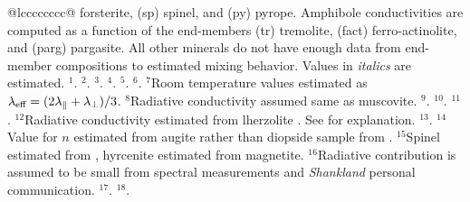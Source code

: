 \begin{table}
\begin{tabular}{@{}lcccccccc@{}}
{        forsterite, (sp) spinel, and (py) pyrope.  Amphibole conductivities
        are computed as a function of the end-members (tr) tremolite,
        (fact) ferro-actinolite, and (parg) pargasite.  All other minerals
        do not have enough data from end-member compositions to estimated
        mixing behavior.  Values in {\it italics} are estimated.
        $^{1}${\citet{Hoefer&Schilling2002}}.
        $^{2}${\citet{Branlund&Hofmeister2007}}.
        $^{3}${\citet{Birch&Clark1940}}.  $^{4}$\citet{Sass1965}.
        $^{5}$\citet{Horai1971}.  $^{6}$\citet{Petrunin_etal2004}.
        $^{7}$Room temperature values {\citep{Clauser&Huenges1995}}
        estimated as $\lambda_{\mbox{\scriptsize{eff}}} = (2
        \lambda_{\parallel} + \lambda_{\perp})/3$.  $^{8}$Radiative
        conductivity assumed same as muscovite.
        $^{9}${\citet{Horai&Simmons1969}}.  $^{10}${\citet{Diment&Pratt1988}}.
        $^{11}$\citet{Hasterok2010a}.  $^{12}$Radiative
        conductivity estimated from lherzolite \citet{Gibert_etal2003}.
        See \citet{Hasterok2010a} for explanation.
        $^{13}$\citet{Harrell2002}.  $^{14}$Value for $n$ estimated from
        augite rather than diopside sample from
        {\citet{Hofmeister&Pertermann2008}}.  $^{15}$Spinel estimated from
        {\citet{Clauser&Huenges1995}}, hyrcenite estimated from magnetite.
        $^{16}$Radiative contribution is assumed to be small from spectral
        measurements \citet{Shankland_etal2005} and {\it Shankland}
        personal communication. $^{17}${\citet{Giesting&Hofmeister2002}}.
        $^{18}$\citet{Osako_etal2004}.
      }
    \end{tabular}
\end{table}
